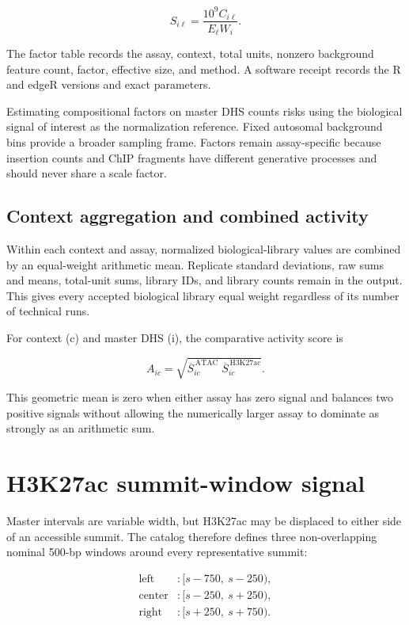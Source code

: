 \documentclass[11pt]{article}
\begin{document}
\[
  S_{i\ell}=\frac{10^9 C_{i\ell}}{E_{\ell}W_i}.
\]

The factor table records the assay, context, total units, nonzero background
feature count, factor, effective size, and method.  A software receipt records
the R and edgeR versions and exact parameters.

Estimating compositional factors on master DHS counts risks using the
biological signal of interest as the normalization reference.  Fixed
autosomal background bins provide a broader sampling frame.  Factors remain
assay-specific because insertion counts and ChIP fragments have different
generative processes and should never share a scale factor.

\subsection{Context aggregation and combined activity}

Within each context and assay, normalized biological-library values are
combined by an equal-weight arithmetic mean.  Replicate standard deviations,
raw sums and means, total-unit sums, library IDs, and library counts remain in
the output.  This gives every accepted biological library equal weight
regardless of its number of technical runs.

For context (c) and master DHS (i), the comparative activity score is

\[
  A_{ic}=\sqrt{\overline{S}^{\,\mathrm{ATAC}}_{ic}
                    \;\overline{S}^{\,\mathrm{H3K27ac}}_{ic}}.
\]

This geometric mean is zero when either assay has zero signal and balances two
positive signals without allowing the numerically larger assay to dominate as
strongly as an arithmetic sum.

\section{H3K27ac summit-window signal}

Master intervals are variable width, but H3K27ac may be displaced to either
side of an accessible summit.  The catalog therefore defines three
non-overlapping nominal 500-bp windows around every representative summit:

\begin{align*}
  \text{left}   &: [s-750,\ s-250),\\
  \text{center} &: [s-250,\ s+250),\\
  \text{right}  &: [s+250,\ s+750).
\end{align*}
\end{document}
